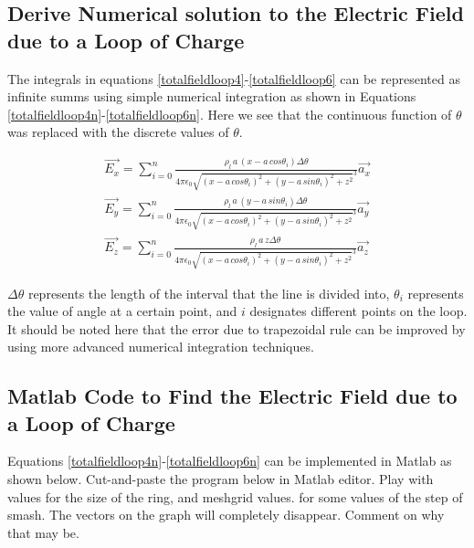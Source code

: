 \documentclass{ximera}
\begin{document}
\subsection{Derive Numerical solution to the Electric Field due to a Loop of Charge}

The integrals in equations \ref{totalfieldloop4}-\ref{totalfieldloop6} can be represented as infinite summs using  simple numerical integration as shown in Equations \ref{totalfieldloop4n}-\ref{totalfieldloop6n}.  Here we see that the continuous function of $\theta$ was replaced with the discrete values of  $\theta$.




\begin{eqnarray}
\vec{E_x}= \sum_{i=0}^{n}\frac{\rho_l \,a \,        (x -  a \,cos{\theta_i})         \Delta \theta }{4 \pi \epsilon_{0} {  \sqrt{(x - a \,cos{\theta_i})^2 +(y - a \,sin{\theta_i})^2 +z ^2}  }^3}    \vec{a_x}  \label{totalfieldloop4n} \\
\vec{E_y}=  \sum_{i=0}^{n}\frac{\rho_l \, a \,   (y - a \,sin{\theta_i})  \Delta  \theta }{4 \pi \epsilon_{0} {  \sqrt{(x - a \,cos{\theta_i})^2 +(y - a \,sin{\theta_i})^2 +z ^2}  }^3}  \vec{a_y}  \label{totalfieldloop5n} \\
\vec{E_z}=  \sum_{i=0}^{n}\frac{\rho_l \, a \,  z   \Delta \theta }{4 \pi \epsilon_{0} {  \sqrt{(x - a \,cos{\theta_i})^2 +(y - a \,sin{\theta_i})^2 +z ^2}  }^3}  \vec{a_z} \label{totalfieldloop6n}
\end{eqnarray}

$\Delta\theta$ represents the length of the interval that the line is divided into, $\theta_i$ represents the value of angle at a certain point, and $i$ designates different points on the loop. It should be noted here that the error due to trapezoidal rule can be improved by using more advanced numerical integration techniques.

\subsection{Matlab Code to Find the Electric Field due to a Loop of Charge }
 

Equations \ref{totalfieldloop4n}-\ref{totalfieldloop6n} can be implemented in Matlab as shown below. Cut-and-paste the program below in Matlab editor. Play with values for the size of the ring, and meshgrid values.  for some values of the step of smash. The vectors on the graph will completely disappear. Comment on why that may be.
\end{document}
